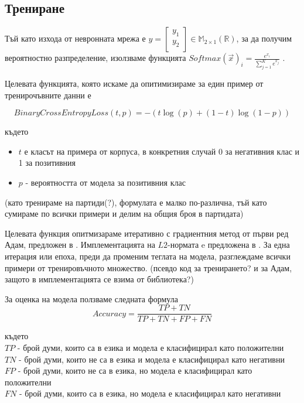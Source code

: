 \documentclass[a4paper,12pt]{article}
\begin{document}
\subsection{Трениране}

Тъй като изхода от невронната мрежа е $y = \begin{bmatrix}
  y_1 \\ 
  y_2 \\ 
\end{bmatrix} \in \mathbb{M}_{2 \times 1} (\mathbb{R})$, за да получим вероятностно разпределение, изолзваме функцията ${Softmax(\vec{x})}_i = \frac{e^{x_i}}{\sum_{j=1}^{K}e^{x_j}}$ . 

Целевата функцията, която искаме да опитимизираме за един пример от тренирочъвните данни е

\begin{equation} \label{eqn}
BinaryCrossEntropyLoss(t, p) = -(t\log(p) + (1-t)\log(1-p))
\end{equation}

където

\begin{itemize}
 \item $t$ е класът на примера от корпуса, в конкретния случай 0 за негативния клас и 1 за позитивния
 \item $p$ - вероятността от модела за позитивния клас
\end{itemize}

(като тренираме на партиди(?), формулата е малко по-различна, тъй като сумираме по всички примери и делим на общия броя в партидата)

Целевата функция опитмизараме итеративно с градиентния метод от първи ред Адам, предложен в \cite{citation07}. Имплементацията на $L2$-нормата e предложена в \cite{citation08}. За една итерация или епоха, преди да променим теглата на модела, разглеждаме всички примери от тренировъчното множество. (псевдо код за тренирането? и за Адам, защото в имплементацията се взима от библиотека?)


За оценка на модела ползваме следната формула
\begin{equation} \label{eqn}
Accuracy = \frac{TP + TN}{TP + TN + FP + FN}
\end{equation}

където\\
$TP$ - брой думи, които са в езика и модела е класифицирал като положителни\\
$TN$ - брой думи, които не са в езика и модела е класифицирал като негативни\\
$FP$ - брой думи, които не са в езика, но модела е класифицирал като положителни\\
$FN$ - брой думи, които са в езика, но модела е класифицирал като негативни\\
\end{document}
